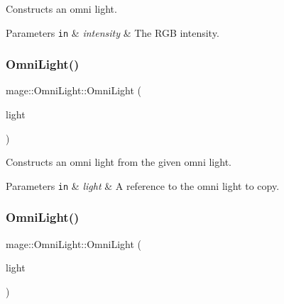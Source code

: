 Constructs an omni light.


\begin{DoxyParams}[1]{Parameters}
\mbox{\tt in}  & {\em intensity} & The R\+GB intensity. \\
\hline
\end{DoxyParams}
\hypertarget{classmage_1_1_omni_light_accf10bcdf8ed523cfb04129f5345ef92}{}\label{classmage_1_1_omni_light_accf10bcdf8ed523cfb04129f5345ef92} 
\subsubsection{\texorpdfstring{Omni\+Light()}{OmniLight()}\hspace{0.1cm}{\footnotesize\ttfamily [2/3]}}
{\footnotesize\ttfamily mage\+::\+Omni\+Light\+::\+Omni\+Light (\begin{DoxyParamCaption}\item[{const \hyperlink{classmage_1_1_omni_light}{Omni\+Light} \&}]{light }\end{DoxyParamCaption})\hspace{0.3cm}{\ttfamily [default]}}

Constructs an omni light from the given omni light.


\begin{DoxyParams}[1]{Parameters}
\mbox{\tt in}  & {\em light} & A reference to the omni light to copy. \\
\hline
\end{DoxyParams}
\hypertarget{classmage_1_1_omni_light_ae0353cedc67d88be2f4b88374482933d}{}\label{classmage_1_1_omni_light_ae0353cedc67d88be2f4b88374482933d} 
\subsubsection{\texorpdfstring{Omni\+Light()}{OmniLight()}\hspace{0.1cm}{\footnotesize\ttfamily [3/3]}}
{\footnotesize\ttfamily mage\+::\+Omni\+Light\+::\+Omni\+Light (\begin{DoxyParamCaption}\item[{\hyperlink{classmage_1_1_omni_light}{Omni\+Light} \&\&}]{light }\end{DoxyParamCaption})\hspace{0.3cm}{\ttfamily [default]}}

